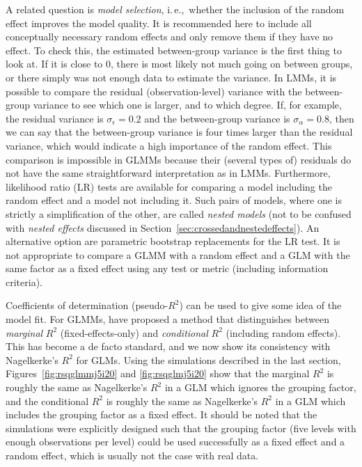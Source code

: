 \documentclass[a4paper,12pt]{article}
\newcommand{\ie}{i.\,e.,\ }
\begin{document}
A related question is \textit{model selection}, \ie whether the inclusion of the random effect improves the model quality.
It is recommended here to include all conceptually necessary random effects and only remove them if they have no effect.
To check this, the estimated between-group variance is the first thing to look at.
If it is close to $0$, there is most likely not much going on between groups, or there simply was not enough data to estimate the variance.
In LMMs, it is possible to compare the residual (observation-level) variance with the between-group variance to see which one is larger, and to which degree.
If, for example, the residual variance is $\sigma_{\epsilon}=0.2$ and the between-group variance is $\sigma_{\alpha}=0.8$, then we can say that the between-group variance is four times larger than the residual variance, which would indicate a high importance of the random effect.
This comparison is impossible in GLMMs because their (several types of) residuals do not have the same straightforward interpretation as in LMMs.
Furthermore, likelihood ratio (LR) tests are available for comparing a model including the random effect and a model not including it.
Such pairs of models, where one is strictly a simplification of the other, are called \textit{nested models} (not to be confused with \textit{nested effects} discussed in Section~\ref{sec:crossedandnestedeffects}).
An alternative option are parametric bootstrap replacements for the LR test.
It is not appropriate to compare a GLMM with a random effect and a GLM with the same factor as a fixed effect using any test or metric (including information criteria).

Coefficients of determination (pseudo-$R^2$) can be used to give some idea of the model fit.
For GLMMs, \citet{NakagawaSchielzeth2013} have proposed a method that distinguishes between \textit{marginal} $R^2$ (fixed-effects-only) and \textit{conditional} $R^2$ (including random effects).
This has become a de facto standard, and we now show its consistency with Nagelkerke's $R^2$ for GLMs.
Using the simulations described in the last section, Figures~\ref{fig:rsqglmmj5i20} and \ref{fig:rsqglmj5i20} show that the marginal $R^2$ is roughly the same as Nagelkerke's $R^2$ in a GLM which ignores the grouping factor, and the conditional $R^2$ is roughly the same as Nagelkerke's $R^2$ in a GLM which includes the grouping factor as a fixed effect.
It should be noted that the simulations were explicitly designed such that the grouping factor (five levels with enough observations per level) could be used successfully as a fixed effect and a random effect, which is usually not the case with real data.
\end{document}
